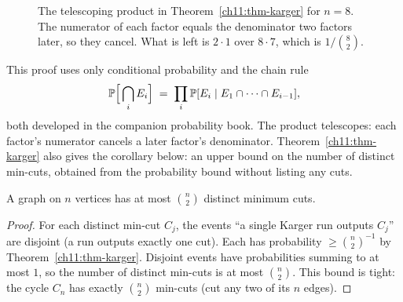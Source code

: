\begin{figure}[htbp]
\centering
{}
\caption{The telescoping product in Theorem~\ref{ch11:thm-karger} for $n=8$. The numerator of each factor equals the denominator two factors later, so they cancel. What is left is $2\cdot 1$ over $8\cdot 7$, which is $1/\binom{8}{2}$.}
\label{ch11:fig-telescope}
\end{figure}

\begin{connectionbox}
This proof uses only conditional probability and the chain rule
\[
  \Pr\Bigl[\,\bigcap_{i} E_i\Bigr] \;=\; \prod_{i} \Pr[E_i\mid E_1\cap\cdots\cap E_{i-1}],
\]
both developed in the companion probability book. The product telescopes: each factor's numerator cancels a later factor's denominator. Theorem~\ref{ch11:thm-karger} also gives the corollary below: an upper bound on the number of distinct min-cuts, obtained from the probability bound without listing any cuts.
\end{connectionbox}

\begin{corollary}\label{ch11:cor-count}
A graph on $n$ vertices has at most $\binom{n}{2}$ distinct minimum cuts.
\end{corollary}

\begin{proof}
For each distinct min-cut $C_j$, the events ``a single Karger run outputs $C_j$'' are disjoint (a run outputs exactly one cut). Each has probability $\ge\binom{n}{2}^{-1}$ by Theorem~\ref{ch11:thm-karger}. Disjoint events have probabilities summing to at most $1$, so the number of distinct min-cuts is at most $\binom{n}{2}$. This bound is tight: the cycle $C_n$ has exactly $\binom{n}{2}$ min-cuts (cut any two of its $n$ edges).
\end{proof}

